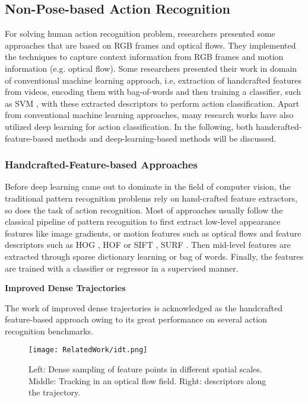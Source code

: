 \subsection{Non-Pose-based Action Recognition}
\label{subsec:non_pose_based_ar}
For solving human action recognition problem, researchers presented some approaches that are based on RGB frames and optical flows. They implemented the techniques to capture context information from RGB frames and motion information (e.g. optical flow). Some researchers presented their work in domain of conventional machine learning approach, i.e, extraction of handcrafted features from videos, encoding them with bag-of-words \cite{Zhang2010bow} and then training a classifier, such as SVM \cite{Cortes1995}, with these extracted descriptors to perform action classification. Apart from conventional machine learning approaches, many research works have also utilized deep learning for action classification. In the following, both handcrafted-feature-based methods and deep-learning-based methods will be discussed. 

\subsubsection{Handcrafted-Feature-based Approaches}
Before deep learning came out to dominate in the field of computer vision, the traditional pattern recognition problems rely on hand-crafted feature extractors, so does the task of action recognition. Most of approaches usually follow the classical pipeline of pattern recognition to first extract low-level appearance features like image gradients, or motion features such as optical flows and feature descriptors such as HOG \cite{Dalal2005}, HOF \cite{Laptev2008} or SIFT \cite{Lowe2004}, SURF \cite{Bay2008}. Then mid-level features are extracted through sparse dictionary learning or bag of words. Finally, the features are trained with a classifier or regressor in a supervised manner. 

\textbf{Improved Dense Trajectories} 

The work of improved dense trajectories \cite{wang2013} is acknowledged as the handcrafted feature-based approach owing to its great performance on several action recognition benchmarks. \\

\begin{figure}[h!]
  \centering
  \texttt{[image: RelatedWork/idt.png]}
  \caption{Left: Dense sampling of feature points in different spatial scales. Middle: Tracking in an
           optical flow field. Right: descriptors along the trajectory. \cite{wang2013}}
  \label{fig:idt}
\end{figure}

